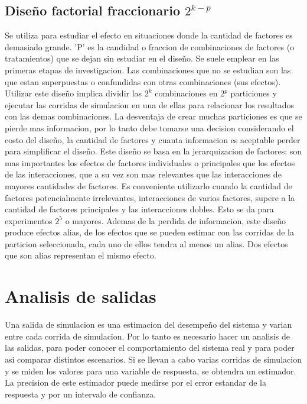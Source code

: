 \documentclass[a4paper]{article}
\begin{document}
\subsection*{Diseño factorial fraccionario $2^{k-p}$}
Se utiliza para estudiar el efecto en situaciones donde la cantidad de factores es demasiado
grande. 'P' es la candidad o fraccion de combinaciones de factores (o tratamientos) que se dejan sin estudiar 
en el diseño.
Se suele emplear en las primeras etapas de investigacion.
Las combinaciones que no se estudian son las que estan superpuestas o confundidas con otras 
combinaciones (sus efectos).
Utilizar este diseño implica dividir las $2^k$ combinaciones en $2^p$ particiones y ejecutar 
las corridas de simulacion en una de ellas para relacionar los resultados con las demas combinaciones.
La desventaja de crear muchas particiones es que se pierde mas informacion, por lo tanto debe 
tomarse una decision considerando el costo del diseño, la cantidad de factores y cuanta informacion 
es aceptable perder para simplificar el diseño.
Este diseño se basa en la jerarquizacion de factores: son mas importantes los efectos de factores 
individuales o principales que los efectos de las interacciones, que a su vez son mas relevantes que
las interacciones de mayores cantidades de factores.
Es conveniente utilizarlo cuando la cantidad de factores potencialmente irrelevantes, interacciones de 
varios factores, supere a la cantidad de factores principales y las interacciones dobles. Esto se da
para experimentos $2^5$ o mayores.
Ademas de la perdida de informacion, este diseño produce efectos alias, de los efectos que se pueden 
estimar con las corridas de la particion seleccionada, cada uno de ellos tendra al menos un alias. 
Dos efectos que son alias representan el mismo efecto.

\section*{Analisis de salidas}
Una salida de simulacion es una estimacion del desempeño del sistema y varian entre cada corrida de 
simulacion. Por lo tanto es necesario hacer un analisis de las salidas, para poder conocer el 
comportamiento del sistema real y para poder asi comparar distintos escenarios.
Si se llevan a cabo varias corridas de simulacion y se miden los valores para una variable de 
respuesta, se obtendra un estimador. La precision de este estimador puede medirse por el error 
estandar de la respuesta y por un intervalo de confianza.
\end{document}
